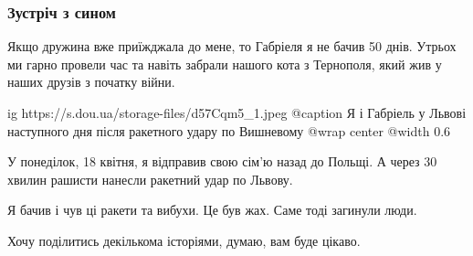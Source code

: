  
 
 
 
 

\subsubsection{Зустріч з сином}
\label{sec:25_04_2022.stz.pc.ua.dou.1.geroizm_pogljad_kapellana.3.zustrich_z_synom}

Якщо дружина вже приїжджала до мене, то Габріеля я не бачив 50 днів. Утрьох ми
гарно провели час та навіть забрали нашого кота з Тернополя, який жив у наших
друзів з початку війни.

\ifcmt
  ig https://s.dou.ua/storage-files/d57Cqm5_1.jpeg
	@caption Я і Габріель у Львові наступного дня після ракетного удару по Вишневому
  @wrap center
  @width 0.6
\fi

У понеділок, 18 квітня, я відправив свою сім'ю назад до Польщі. А через 30
хвилин рашисти нанесли ракетний удар по Львову.

Я бачив і чув ці ракети та вибухи. Це був жах. Саме тоді загинули люди.

Хочу поділитись декількома історіями, думаю, вам буде цікаво.
